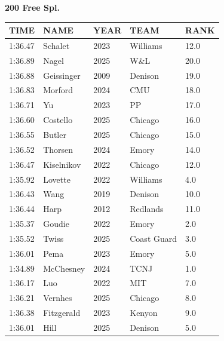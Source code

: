 \begin{table}[H]
\centering
\begin{minipage}[t]{0.6\textwidth}
\centering
\textbf{200 Free Spl.}\\[0.1cm]
\begin{tabular}{@{}p{1.8cm}p{2.8cm}p{1.2cm}p{1.4cm}p{0.8cm}@{}}
\hline
    \textbf{TIME} & \textbf{NAME} & \textbf{YEAR} & \textbf{TEAM} & \textbf{RANK} \\
\hline
    1:36.47 & Schalet & 2023 & Williams & 12.0 \\
    1:36.89 & Nagel & 2025 & W\&L & 20.0 \\
    1:36.88 & Geissinger & 2009 & Denison & 19.0 \\
    1:36.83 & Morford & 2024 & CMU & 18.0 \\
    1:36.71 & Yu & 2023 & PP & 17.0 \\
    1:36.60 & Costello & 2025 & Chicago & 16.0 \\
    1:36.55 & Butler & 2025 & Chicago & 15.0 \\
    1:36.52 & Thorsen & 2024 & Emory & 14.0 \\
    1:36.47 & Kiselnikov & 2022 & Chicago & 12.0 \\
    1:35.92 & Lovette & 2022 & Williams & 4.0 \\
    1:36.43 & Wang & 2019 & Denison & 10.0 \\
    1:36.44 & Harp & 2012 & Redlands & 11.0 \\
    1:35.37 & Goudie & 2022 & Emory & 2.0 \\
    1:35.52 & Twiss & 2025 & Coast Guard & 3.0 \\
    1:36.01 & Pema & 2023 & Emory & 5.0 \\
    1:34.89 & McChesney & 2024 & TCNJ & 1.0 \\
    1:36.17 & Luo & 2022 & MIT & 7.0 \\
    1:36.21 & Vernhes & 2025 & Chicago & 8.0 \\
    1:36.38 & Fitzgerald & 2023 & Kenyon & 9.0 \\
    1:36.01 & Hill & 2025 & Denison & 5.0 \\
\hline
\end{tabular}
\end{minipage}
\end{table}

